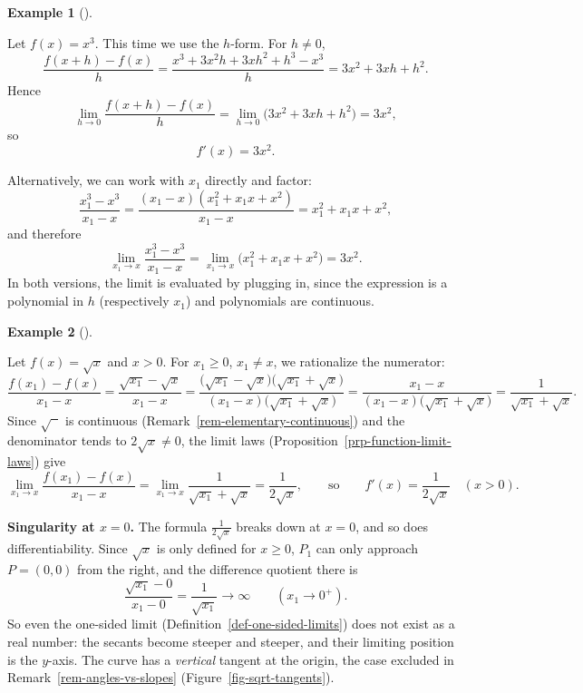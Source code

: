 \documentclass[
  letterpaper,
  DIV=11,
  numbers=noendperiod]{scrreprt}
\theoremstyle{plain}
\theoremstyle{plain}
\theoremstyle{definition}
\theoremstyle{definition}
\theoremstyle{definition}
\newtheorem{example}{Example}[chapter]
\theoremstyle{plain}
\theoremstyle{plain}
\theoremstyle{remark}
\begin{document}
\begin{example}[]\protect\hypertarget{exm-derivative-cube}{}\label{exm-derivative-cube}

\hfill\break
Let \(f(x)=x^3\). This time we use the \(h\)-form. For \(h\neq0\), \[
\frac{f(x+h)-f(x)}{h} = \frac{x^3+3x^2h+3xh^2+h^3-x^3}{h} = 3x^2+3xh+h^2.
\] Hence \[
\lim_{h\to0}\frac{f(x+h)-f(x)}{h} = \lim_{h\to0}\big(3x^2+3xh+h^2\big) = 3x^2,
\] so \[
f'(x) = 3x^2.
\]

Alternatively, we can work with \(x_1\) directly and factor: \[
\frac{x_1^3-x^3}{x_1-x} = \frac{(x_1-x)(x_1^2+x_1x+x^2)}{x_1-x} = x_1^2+x_1x+x^2,
\] and therefore \[
\lim_{x_1\to x}\frac{x_1^3-x^3}{x_1-x} = \lim_{x_1\to x}\big(x_1^2+x_1x+x^2\big) = 3x^2.
\] In both versions, the limit is evaluated by plugging in, since the
expression is a polynomial in \(h\) (respectively \(x_1\)) and
polynomials are continuous.

\end{example}

\begin{example}[]\protect\hypertarget{exm-derivative-sqrt}{}\label{exm-derivative-sqrt}

\hfill\break
Let \(f(x)=\sqrt{x}\) and \(x>0\). For \(x_1\geq0\), \(x_1\neq x\), we
rationalize the numerator: \[
\frac{f(x_1)-f(x)}{x_1-x} = \frac{\sqrt{x_1}-\sqrt{x}}{x_1-x}
= \frac{\big(\sqrt{x_1}-\sqrt{x}\big)\big(\sqrt{x_1}+\sqrt{x}\big)}{(x_1-x)\big(\sqrt{x_1}+\sqrt{x}\big)}
= \frac{x_1-x}{(x_1-x)\big(\sqrt{x_1}+\sqrt{x}\big)}
= \frac{1}{\sqrt{x_1}+\sqrt{x}}.
\] Since \(\sqrt{\phantom{x}}\) is continuous
(Remark~\ref{rem-elementary-continuous}) and the denominator tends to
\(2\sqrt x\neq0\), the limit laws
(Proposition~\ref{prp-function-limit-laws}) give \[
\lim_{x_1\to x}\frac{f(x_1)-f(x)}{x_1-x} = \lim_{x_1\to x}\frac{1}{\sqrt{x_1}+\sqrt{x}} = \frac{1}{2\sqrt{x}},
\qquad\text{so}\qquad
f'(x) = \frac{1}{2\sqrt{x}} \quad (x>0).
\]

\textbf{Singularity at \(x=0\).} The formula \(\frac1{2\sqrt x}\) breaks
down at \(x=0\), and so does differentiability. Since \(\sqrt x\) is
only defined for \(x\geq0\), \(P_1\) can only approach \(P=(0,0)\) from
the right, and the difference quotient there is \[
\frac{\sqrt{x_1}-0}{x_1-0} = \frac{1}{\sqrt{x_1}} \longrightarrow \infty \qquad (x_1\to0^+).
\] So even the one-sided limit (Definition~\ref{def-one-sided-limits})
does not exist as a real number: the secants become steeper and steeper,
and their limiting position is the \(y\)-axis. The curve has a
\emph{vertical} tangent at the origin, the case excluded in
Remark~\ref{rem-angles-vs-slopes} (Figure~\ref{fig-sqrt-tangents}).

\end{example}
\end{document}
